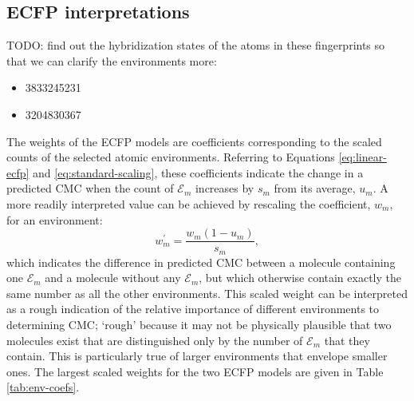 \subsection{ECFP interpretations}

TODO: find out the hybridization states of the atoms in these fingerprints
so that we can clarify the environments more:
\begin{itemize}
    \item 3833245231
    \item 3204830367
\end{itemize}

The weights of the ECFP models are coefficients corresponding to the scaled counts of the selected atomic environments. Referring to Equations \ref{eq:linear-ecfp} and \ref{eq:standard-scaling}, these coefficients indicate
the change in a predicted CMC when the count of $\mathcal{E}_m$ increases by $s_m$ from its average, $u_m$. A more readily interpreted value can be achieved by rescaling the coefficient, $w_m$, for an environment:
\begin{equation}
    w_m^\prime = \frac{w_m(1 - u_m)}{s_m},
\end{equation}
which indicates the difference in predicted CMC between a molecule containing one $\mathcal{E}_m$ and a molecule without any $\mathcal{E}_m$, but which otherwise contain exactly the same number as all the other environments. This
scaled weight can be interpreted as a rough indication of the relative importance of different environments to determining CMC; `rough' because it may not be physically plausible that two molecules exist that are distinguished only
by the number of $\mathcal{E}_m$ that they contain. This is particularly true of larger environments that envelope smaller ones. The largest scaled weights for the two ECFP models are given in Table \ref{tab:env-coefs}.

